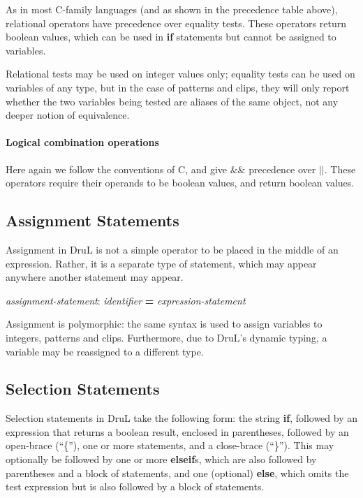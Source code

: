 As in most C-family languages (and as shown in the precedence table above), relational operators have precedence over equality tests.  These operators return boolean values, which can be used in \textbf{if} statements but cannot be assigned to variables.

Relational tests may be used on integer values only; equality tests can be used on variables of any type, but in the case of patterns and clips, they will only report whether the two variables being tested are  aliases of the same object, not any deeper notion of equivalence.

\paragraph{Logical combination operations}

Here again we follow the conventions of C, and give $\&\&$ precedence over $||$.  These operators require their operands to be boolean values, and return boolean values.

\subsection{Assignment Statements}

Assignment in DruL is not a simple operator to be placed in the middle of an expression.  Rather, it is a separate type of statement, which may appear anywhere another statement may appear.

\begin{center}
\emph{assignment-statement}: \emph{identifier} \textbf{=}  \emph{expression-statement}
\end{center}

Assignment is polymorphic: the same syntax is used to assign variables to
integers, patterns and clips. Furthermore, due to DruL's dynamic typing,
a variable may be reassigned to a different type.

\subsection{Selection Statements}

Selection statements in DruL take the following form: the string \textbf{if}, followed by an expression that returns a boolean result, enclosed in parentheses, followed by an open-brace (``\{''), one or more statements, and a close-brace (``\}'').  This may optionally be followed by one or more \textbf{elseif}s, which are also followed by parentheses and a block of statements, and one (optional) \textbf{else}, which omits the test expression but is also followed by a block of statements.

